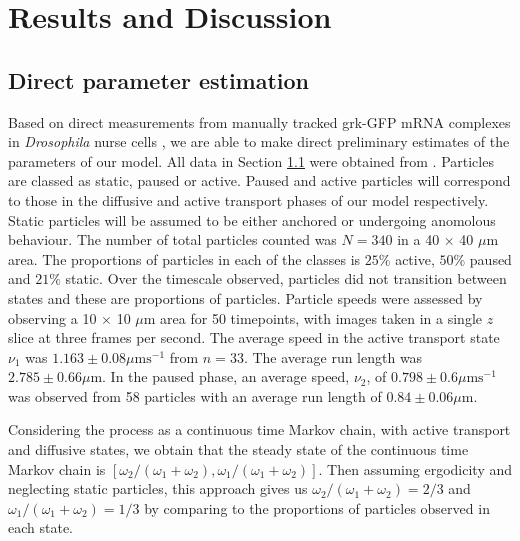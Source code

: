 \documentclass[twocolumn]{biophys}
\begin{document}
\section{Results and Discussion} \label{Results}

\subsection{Direct parameter estimation} \label{Direct}
Based on direct measurements from manually tracked grk-GFP mRNA complexes in \textit{Drosophila} nurse cells \citep{neuman1996drosophila}, we are able to make direct preliminary estimates of the parameters of our model.
All data in Section \ref{Direct} were obtained from \citet{DavidsonPhD2015}.
Particles are classed as static, paused or active.
Paused and active particles will correspond to those in the diffusive and active transport phases of our model respectively. 
Static particles will be assumed to be either anchored or undergoing anomolous behaviour. 
The number of total particles counted was $N=340$ in a 40 $\times$ 40 $\mu \text{m}$ area.
The proportions of particles in each of the classes is $25\%$ active, $50\%$ paused and $21\%$ static. 
Over the timescale observed, particles did not transition between states and these are proportions of particles. 
Particle speeds were assessed by observing a 10 $\times$ 10 $\mu \text{m}$ area for 50 timepoints, with images taken in a single $z$ slice at three frames per second. 
The average speed in the active transport state $\nu_1 $ was  $1.163 \pm 0.08 \mu \text{ms}^{-1}$ from $n=33$. 
The average run length was $2.785 \pm 0.66 \mu \text{m}$. 
In the paused phase, an average speed, $\nu_2$, of $0.798 \pm 0.6 \mu \text{ms}^{-1}$ was observed from 58 particles with an average run length of  $0.84 \pm 0.06 \mu \text{m}$. 

Considering the process as a continuous time Markov chain, with active transport and diffusive states, we obtain that the steady state of the continuous time Markov chain is $[\omega_2 /(\omega_1 + \omega_2), \omega_1/(\omega_1+\omega_2)]$. 
Then assuming ergodicity and neglecting static particles, this approach gives us $\omega_2 /(\omega_1 + \omega_2) = 2/3$ and $\omega_1 /(\omega_1 + \omega_2) = 1/3$ by comparing to the proportions of particles observed in each state.
\end{document}
